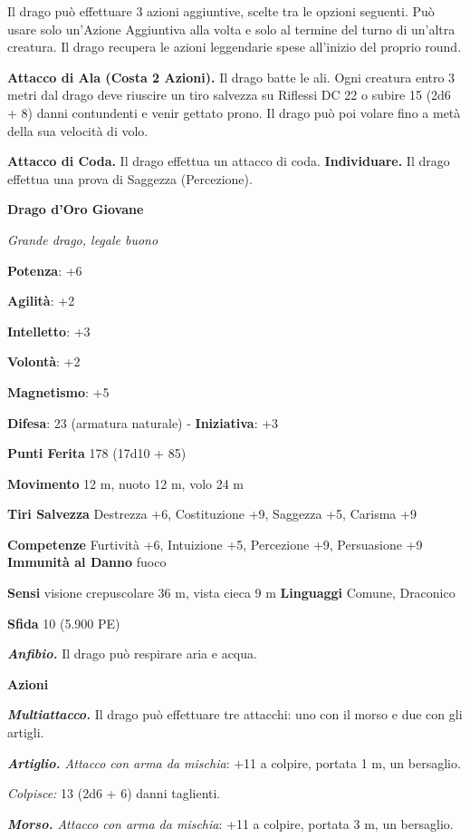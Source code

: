 \begin{multicols}{2}
Il drago può effettuare 3 azioni aggiuntive, scelte tra le opzioni
seguenti. Può usare solo un'Azione Aggiuntiva alla volta e solo al
termine del turno di un'altra creatura. Il drago recupera le azioni
leggendarie spese all'inizio del proprio round.

\textbf{Attacco di Ala (Costa 2 Azioni).} Il drago batte le ali. Ogni
creatura entro 3 metri dal drago deve riuscire un tiro salvezza su Riflessi DC 22 o subire 15 (2d6 + 8) danni contundenti e venir gettato
prono. Il drago può poi volare fino a metà della sua velocità di volo.

\textbf{Attacco di Coda.} Il drago effettua un attacco di coda.
\textbf{Individuare.} Il drago effettua una prova di Saggezza
(Percezione).

\textbf{Drago d'Oro Giovane}

\emph{Grande drago, legale buono}

\textbf{Potenza}: +6

\textbf{Agilità}: +2

\textbf{Intelletto}: +3

\textbf{Volontà}: +2

\textbf{Magnetismo}: +5

\textbf{Difesa}: 23 (armatura naturale) - \textbf{Iniziativa}: +3

\textbf{Punti Ferita} 178 (17d10 + 85)

\textbf{Movimento} 12 m, nuoto 12 m, volo 24 m

\textbf{Tiri Salvezza} Destrezza +6, Costituzione +9, Saggezza +5,
Carisma +9

\textbf{Competenze} Furtività +6, Intuizione +5, Percezione +9, Persuasione
+9 \textbf{Immunità al Danno} fuoco

\textbf{Sensi} visione crepuscolare 36 m, vista cieca 9 m
\textbf{Linguaggi} Comune, Draconico

\textbf{Sfida} 10 (5.900 PE)\smallskip

\emph{\textbf{Anfibio.}} Il drago può respirare aria e acqua.

\smallskip\textbf{Azioni}

\emph{\textbf{Multiattacco.}} Il drago può effettuare tre attacchi: uno
con il morso e due con gli artigli.

\emph{\textbf{Artiglio.} Attacco con arma da mischia}: +11 a colpire,
portata 1 m, un bersaglio.

\emph{Colpisce:} 13 (2d6 + 6) danni taglienti.

\emph{\textbf{Morso.} Attacco con arma da mischia}: +11 a colpire,
portata 3 m, un bersaglio.


\end{multicols}
